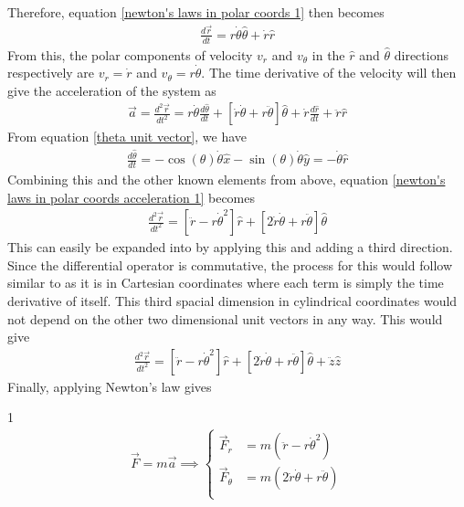 Therefore, equation \ref{newton's laws in polar coords 1} then becomes
\begin{align}
\frac{d \vec{r}}{dt} = r\dot{\theta} \hat{\theta} + \dot{r} \hat{r} \label{newton's laws in polar coords 2}
\end{align}
From this, the polar components of velocity $v_r$ and $v_\theta$ in the $\hat{r}$ and $\hat{\theta}$ directions respectively are $v_r = \dot{r}$ and $v_\theta = r\dot{\theta}$. The time derivative of the velocity will then give the acceleration of the system as
\begin{align}
\vec{a} = \frac{d^2 \vec{r}}{dt^2} = r\dot{\theta} \frac{d\hat{\theta}}{dt} + \left[\dot{r}\dot{\theta} + r\ddot{\theta}\right] \hat{\theta}      + \dot{r} \frac{d\hat{r}}{dt}  + \ddot{r} \hat{r} \label{newton's laws in polar coords acceleration 1}
\end{align}
From equation \ref{theta unit vector}, we have
\begin{align}
\frac{d\hat{\theta}}{dt} = -\cos(\theta)\dot{\theta}\hat{x} - \sin(\theta)\dot{\theta}\hat{y} = -\dot{\theta}\hat{r}
\end{align}
Combining this and the other known elements from above, equation \ref{newton's laws in polar coords acceleration 1} becomes
\begin{align}
\frac{d^2 \vec{r}}{dt^2} = \left[\ddot{r}-r\dot{\theta}^2\right]\hat{r} + \left[2\dot{r}\dot{\theta} + r\ddot{\theta}\right] \hat{\theta} \label{newton's laws in polar coords acceleration 2}
\end{align}
This can easily be expanded into  by applying this and adding a third direction. Since the differential operator is commutative, the process for this would follow similar to as it is in Cartesian coordinates where each term is simply the time derivative of itself. This third spacial dimension in cylindrical coordinates would not depend on the other two dimensional unit vectors in any way. This would give 
\begin{align}
\frac{d^2 \vec{r}}{dt^2} = \left[\ddot{r}-r\dot{\theta}^2\right]\hat{r} + \left[2\dot{r}\dot{\theta} + r\ddot{\theta}\right] \hat{\theta} + \ddot{z}\hat{z} \label{newton's laws in polar coords acceleration 3}
\end{align}
Finally, applying Newton's law gives 
\begin{defn}{1}
\begin{align}
\vec{F} = m\vec{a}  \implies \left\{
\begin{array}{ll}
      \vec{F}_r &= m(\ddot{r}-r\dot{\theta}^2) \\
      \vec{F}_\theta &= m(2\dot{r}\dot{\theta} + r\ddot{\theta}) \\
\end{array} \right. 
\end{align}
\end{defn}








